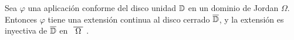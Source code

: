 \begin{comment}
\begin{prop}
    Sea $U \subset \complex$. Una aplicación $f: U \rightarrow \complex$ es conforme en $U$ si satisface las condiciones de Cauchy-Riemann y $f'(z) \not = 0 \, \forall z \in U$.
\end{prop}

\begin{proof}
    Sea $f$ una función continua tal que $f(z) = u(x,y) + i v(x,y), z = x+iv$. Sabemos, por hipótesis, que $u(x,y)$ y $v(x,y)$ son funciones continuamente diferenciables.

    Consideremos la curva suave $\gamma : [a,b] \rightarrow U$, que escribimos como $\gamma (t) = \rho (t) + i \sigma (t)$. Entonces,
    \begin{equation*}
        f(\gamma (t)) = u(\rho (t), \sigma (t)) + i v(\rho (t), \sigma (t)).
    \end{equation*}

    Como $f(\gamma (t))$ es continuamente diferenciable,
    \begin{equation}
        \label{cauchy-riemann}
        \frac{d}{dt}f(\gamma (t)) = u_x \rho' (t) + u_y \sigma' (t) + i (v_x \rho'(t) + v_y \sigma'(t)).
    \end{equation}

    Por hipótesis tenemos que
    \begin{equation*}
        \frac{\partial (u,v)}{\partial (x,y)} =
        \left|
        \begin{matrix}
            u_x(x,y) & u_y(x,y) \\ v_x(x,y) & v_y(x,y)
        \end{matrix}
        \right| \not = 0,
    \end{equation*}
    por lo que $\frac{d}{dt} f(\gamma (t)) \not = 0$ en $t = 0$ pues $\rho' (t) + i \sigma' (t) = \gamma' (t) \not = 0$. Es decir, la curva $f (\gamma)$ es suave en un entorno de su origen. Por lo tanto, si $\gamma_1$ y $\gamma_2$ son curvas suaves con origen $c$, el ángulo entre $f(\gamma_1)$ y $f(\gamma_2)$ en $f(c)$ está bien definido.
\end{proof}
\end{comment}
\bigskip

\begin{theorem}
    Sea $\varphi$ una aplicación conforme del disco unidad $\mathbb{D}$ en un dominio de Jordan $\Omega$. Entonces $\varphi$ tiene una extensión continua al disco cerrado $\overline{\mathbb{D}}$, y la extensión es inyectiva de $\overline{\mathbb{D}}$ en $\xbar{\Omega}$.
\end{theorem}

